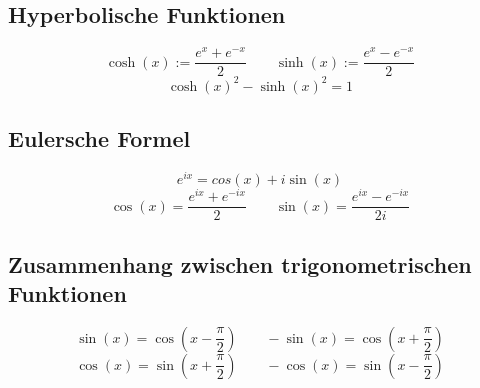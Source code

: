 \documentclass[10pt,a4paper]{article}
\begin{document}
\subsection*{Hyperbolische Funktionen}
\[\cosh(x) := \frac{e^x + e^{-x}}{2} \qquad \sinh(x) := \frac{e^x - e^{-x}}{2}\] 
\[\cosh(x)^2 - \sinh(x)^2 = 1\]

\subsection*{Eulersche Formel}
\[e^{ix}=cos(x)+i\sin(x)\]
\[\cos(x)=\frac{e^{ix}+e^{-ix}}{2}\qquad \sin(x)=\frac{e^{ix}-e^{-ix}}{2i}\]

\subsection*{Zusammenhang zwischen trigonometrischen Funktionen}
\[\sin(x)=\cos\left(x-\frac{\pi}{2}\right) \qquad -\sin(x)=\cos\left(x+\frac{\pi}{2}\right)\]
\[\cos(x)=\sin\left(x+\frac{\pi}{2}\right) \qquad -\cos(x)=\sin\left(x-\frac{\pi}{2}\right)\]
\end{document}
